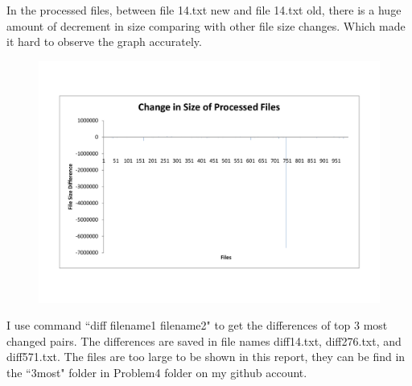 \documentclass[12pt]{article}
\begin{document}
In the processed files, between file 14.txt new and file 14.txt old, there is a huge amount of decrement in size comparing with other file size changes. Which made it hard to observe the graph accurately. 
\newpage

\begin{figure}[h!]
\centering
\includegraphics[width=6.5in]{ProcessedDifference.pdf}
\end{figure}



I use command ``diff filename1 filename2" to get the differences of top 3 most changed pairs. The differences are saved in file names diff14.txt, diff276.txt, and diff571.txt. The files are too large to be shown in this report, they can be find in the ``3most" folder in Problem4 folder on my github account. 
\end{document}
